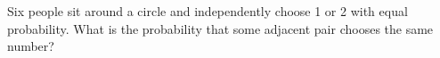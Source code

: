 Six people sit around a circle and independently choose 1 or 2 with equal probability. What is the probability that some adjacent pair chooses the same number?
